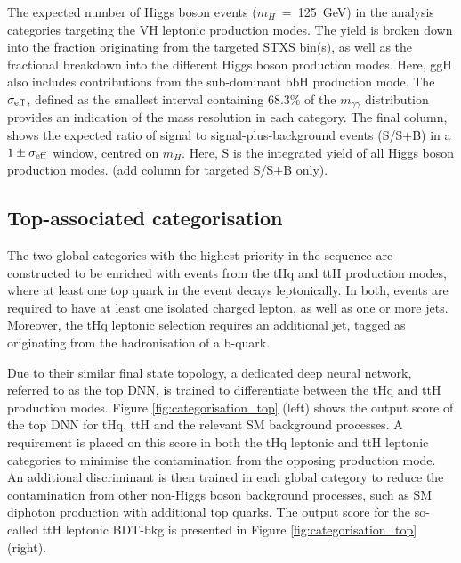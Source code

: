 \begin{table}[htb]
    \caption[Expected yields for the VH leptonic production mode categories]{The expected number of Higgs boson events ($m_H$~=~125~GeV) in the analysis categories targeting the VH leptonic production modes. The yield is broken down into the fraction originating from the targeted STXS bin(s), as well as the fractional breakdown into the different Higgs boson production modes. Here, ggH also includes contributions from the sub-dominant bbH production mode. The $\sigma_{\rm{eff}}$, defined as the smallest interval containing 68.3\% of the $m_{\gamma\gamma}$ distribution provides an indication of the mass resolution in each category. The final column, shows the expected ratio of signal to signal-plus-background events (S/S+B) in a $1\pm\sigma_{\rm{eff}}$ window, centred on $m_H$. Here, S is the integrated yield of all Higgs boson production modes. (add column for targeted S/S+B only).}
    \label{tab:vhlep_category_yields}
    \centering
    \scriptsize
    \renewcommand{\arraystretch}{1.3}
    \setlength{\tabcolsep}{2pt}
    
\end{table}

\FloatBarrier

\subsection{Top-associated categorisation}
The two global categories with the highest priority in the sequence are constructed to be enriched with events from the tHq and ttH production modes, where at least one top quark in the event decays leptonically. In both, events are required to have at least one isolated charged lepton, as well as one or more jets. Moreover, the tHq leptonic selection requires an additional jet, tagged as originating from the hadronisation of a b-quark. 

Due to their similar final state topology, a dedicated deep neural network, referred to as the top DNN, is trained to differentiate between the tHq and ttH production modes. Figure \ref{fig:categorisation_top} (left) shows the output score of the top DNN for tHq, ttH and the relevant SM background processes. A requirement is placed on this score in both the tHq leptonic and ttH leptonic categories to minimise the contamination from the opposing production mode. An additional discriminant is then trained in each global category to reduce the contamination from other non-Higgs boson background processes, such as SM diphoton production with additional top quarks. The output score for the so-called ttH leptonic BDT-bkg is presented in Figure \ref{fig:categorisation_top} (right). 

